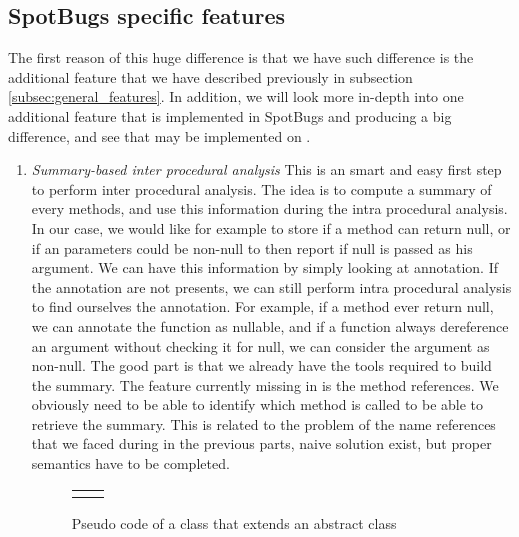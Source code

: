 \subsection{SpotBugs specific features}
\label{subsec:spotbugs_specific}

The first reason of this huge difference is that we have such difference is the additional feature that we have described previously in subsection \ref{subsec:general_features}.
In addition, we will look more in-depth into one additional feature that is implemented in SpotBugs and producing a big difference, and see that may be implemented on \slang.

\begin{enumerate}
	\item \textit{Summary-based inter procedural analysis} \newline
	This is an smart and easy first step to perform inter procedural analysis.
	The idea is to compute a summary of every methods, and use this information during the intra procedural analysis. 
	In our case, we would like for example to store if a method can return null, or if an parameters could be non-null to then report if null is passed as his argument. 
	We can have this information by simply looking at annotation. If the annotation are not presents, we can still perform intra procedural analysis to find ourselves the annotation. For example, if a method ever return null, we can annotate the function as nullable, and if a function always dereference an argument without checking it for null, we can consider the argument as non-null. 
	The good part is that we already have the tools required to build the summary. The feature currently missing in \slang is the method references. 
	We obviously need to be able to identify which method is called to be able to retrieve the summary.
	This is related to the problem of the name references that we faced during in the previous parts, naive solution exist, but proper semantics have to be completed.	


\begin{figure}[h]
	\centering
	\caption{Pseudo code of a class that extends an abstract class}
	\label{figure:class-extends-abtract}
	\setlength{\tabcolsep}{24pt}
	\begin{tabular}{cc}
		\multicolumn{1}{c}{} & \multicolumn{1}{c}{} \\
	\end{tabular}
\end{figure}
	

\end{enumerate}

